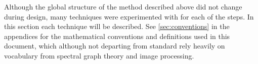 Although the global structure of the method described above did not change during design, many techniques were experimented with for each of the steps. In this section each technique will be described. See \autoref{sec:conventions} in the appendices for the mathematical conventions and definitions used in this document, which although not departing from standard rely heavily on vocabulary from spectral graph theory and image processing.






